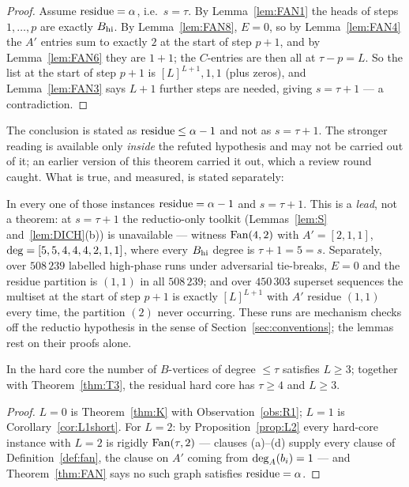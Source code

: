 \begin{proof}
Assume $\operatorname{residue} = \alpha$, i.e.\ $s = \tau$. By Lemma~\ref{lem:FAN1} the heads of steps
$1,\dots,p$ are exactly $B_{\mathrm{hi}}$. By Lemma~\ref{lem:FAN8}, $E = 0$, so by
Lemma~\ref{lem:FAN4} the $A'$ entries sum to exactly $2$ at the start of step $p+1$, and by
Lemma~\ref{lem:FAN6} they are $1+1$; the $C$-entries are then all at $\tau - p = L$. So the
list at the start of step $p+1$ is $[L]^{L+1},1,1$ (plus zeros), and
Lemma~\ref{lem:FAN3} says $L+1$ further steps are needed, giving $s = \tau+1$ --- a
contradiction.
\end{proof}

The conclusion is stated as $\operatorname{residue} \le \alpha-1$ and not as $s = \tau+1$. The stronger reading
is available only \emph{inside} the refuted hypothesis and may not be carried out of it;
an earlier version of this theorem carried it out, which a review round caught. What is
true, and measured, is stated separately:

\begin{observation}\label{obs:FANE}
In every one of those instances $\operatorname{residue} = \alpha - 1$ and $s = \tau+1$. This is a
\emph{lead}, not a theorem: at $s = \tau+1$ the reductio-only toolkit
(Lemmas~\ref{lem:S} and~\ref{lem:DICH}(b)) is unavailable --- witness $\mathrm{Fan}(4,2)$ with
$A' = [2,1,1]$, $\mathrm{deg} = [5,5,4,4,4,2,1,1]$, where every $B_{\mathrm{hi}}$ degree is
$\tau+1 = 5 = s$. Separately, over $508\,239$ labelled high-phase runs under adversarial
tie-breaks, $E = 0$ and the residue partition is $(1,1)$ in all $508\,239$; and over
$450\,303$ superset sequences the multiset at the start of step $p+1$ is exactly
$[L]^{L+1}$ with $A'$ residue $(1,1)$ every time, the partition $(2)$ never occurring.
These runs are mechanism checks off the reductio hypothesis in the sense of
Section~\ref{sec:conventions}; the lemmas rest on their proofs alone.
\end{observation}

\begin{corollary}\label{cor:FANHC}
In the hard core the number of $B$-vertices of degree $\le \tau$ satisfies $L \ge 3$;
together with Theorem~\ref{thm:T3}, the residual hard core has $\tau \ge 4$ and $L \ge 3$.
\end{corollary}

\begin{proof}
$L = 0$ is Theorem~\ref{thm:K} with Observation~\ref{obs:R1}; $L = 1$ is
Corollary~\ref{cor:L1short}. For $L = 2$: by Proposition~\ref{prop:L2} every hard-core
instance with $L = 2$ is rigidly $\mathrm{Fan}(\tau,2)$ --- clauses (a)--(d) supply every clause of
Definition~\ref{def:fan}, the clause on $A'$ coming from $\mathrm{deg}_A(b_i) = 1$ --- and
Theorem~\ref{thm:FAN} says no such graph satisfies $\operatorname{residue} = \alpha$.
\end{proof}

